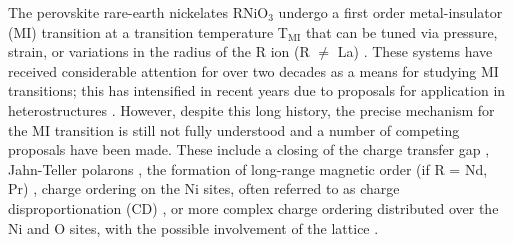 \documentclass[showpacs,preprintnumbers,amsmath,amssymb,prl,aps,twocolumn,superscriptaddress]{revtex4}
\begin{document}
 \maketitle 


The perovskite rare-earth nickelates RNiO$_3$ undergo a first order
metal-insulator (MI) transition at a transition temperature
T$_{\mathrm{MI}}$ that can be tuned via pressure, strain, or
variations in the radius of the R ion (R $\ne$ La)
\cite{TorrancePRB1992, Review}.  These systems have received
considerable attention for over two decades as a means for studying MI
transitions; this has intensified in recent years due to proposals for
application in heterostructures
\cite{ChaloupkaPRL2008,HansmannPRL2009,LiuPRB2011}.  However, despite
this long history, the precise mechanism for the MI
transition is still not fully understood and a number of competing
proposals have been made.  These include a closing of the charge
transfer gap \cite{TorrancePRB1992}, Jahn-Teller polarons
\cite{MedardeIsotope}, the formation of long-range magnetic order (if
R = Nd, Pr) \cite{BalentsPRB2011,BalentsPRL2011}, charge 
ordering on the Ni sites, often referred to as charge
disproportionation (CD)
\cite{Review,AlonsoPRL1999,MedardePRB2008,MedardePRB2009,GarciaMunozPRB2009,
  AlonsoPRB2000,AlonsoPRB2001,AlonsoPRB2013}, or more complex charge
ordering distributed over the Ni and O sites, with the possible
involvement of the lattice
\cite{MizokawaPRB2000,ParkPRL2012,LauPRL2013}.
\end{document}
